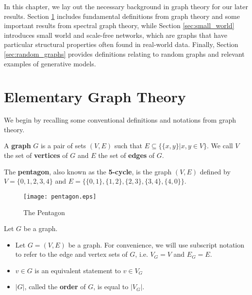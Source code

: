 In this chapter, we lay out the necessary background in graph theory for our later results. Section
\ref{sec:intro_graphs} includes fundamental definitions from graph theory and some important results
from spectral graph theory, while Section \ref{sec:small_world} introduces small world and scale-free
networks, which are graphs that have particular structural properties often found in real-world data.
Finally, Section \ref{sec:random_graphs} provides definitions relating to random graphs and relevant examples
of generative models.

\section{Elementary Graph Theory}
\label{sec:intro_graphs}




We begin by recalling some conventional definitions and notations from graph
theory.

\begin{definition}
  A \textbf{graph} $G$ is a pair of sets $(V,E)$ such that
  $E \subseteq \{ \{x,y\} | x,y \in V \}$. We call $V$ the set of
  \textbf{vertices} of $G$ and $E$ the set of \textbf{edges} of $G$.
\end{definition}


\begin{example}
  The \textbf{pentagon}, also known as the \textbf{5-cycle}, is the graph $(V,E)$ defined by
  $V = \{0,1,2,3,4\}$ and $E = \{\{0,1\}, \{1,2\}, \{2,3\},\allowbreak \{3,4\}, \{4,0\}\}$.
\end{example}

\begin{figure}[H]
  \centering
  \texttt{[image: pentagon.eps]}
  \caption{The Pentagon}
  \label{fig:pentagon}
\end{figure}

\begin{remark}[Notation]
  Let $G$ be a graph.

  \begin{itemize}
  \item Let $G = (V,E)$ be a graph. For convenience, we will use subscript
    notation to refer to the edge and vertex sets of $G$, i.e. $V_G = V$ and
    $E_G = E$.
  \item $v \in G$ is an equivalent statement to $v \in V_G$
  \item $|G|$, called the \textbf{order} of $G$, is equal to $|V_G|$.
  \end{itemize}
\end{remark}

